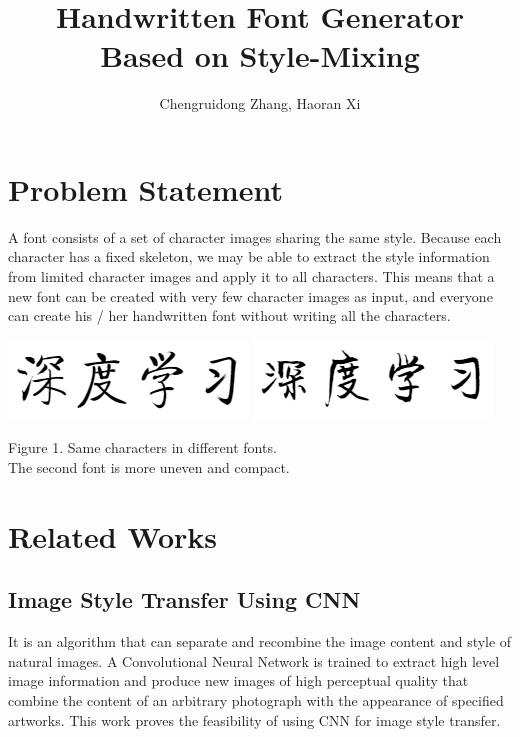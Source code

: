 \documentclass[letterpaper]{article}
\begin{document}
%
\title{Handwritten Font Generator \\ Based on Style-Mixing}
\author{Chengruidong Zhang, Haoran Xi}
\maketitle

\section{Problem Statement}
A font consists of a set of character images sharing the same style. Because each character has a fixed skeleton, we may be able to extract the style information from limited character images and apply it to all characters. This means that a new font can be created with very few character images as input, and everyone can create his / her handwritten font without writing all the characters.

\begin{center}
    \includegraphics[]{proposal-fig-qiti.png}
    \includegraphics[]{proposal-fig-jinglei.png}

    Figure 1. Same characters in different fonts.\\The second font is more uneven and compact.
\end{center}


\section{Related Works}
\subsection{Image Style Transfer Using CNN}
It is an algorithm that can separate and recombine the image content and style of natural images. A Convolutional Neural Network is trained to extract high level image information and produce new images of high perceptual quality that combine the content of an arbitrary photograph with the appearance of specified artworks. This work proves the feasibility of using CNN for image style transfer.
\end{document}
